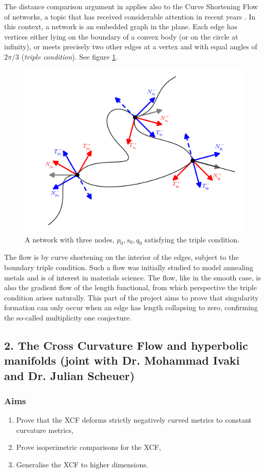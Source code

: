 \documentclass[12pt]{amsart}
\begin{document}
The distance comparison argument in \cite{MR2794630} applies also to the Curve Shortening Flow of networks, a topic that has received considerable attention in recent years \cite{MR2394409,MR2075985,MR2763716}. In this context, a network is an embedded graph in the plane. Each edge has vertices either lying on the boundary of a convex body (or on the circle at infinity), or meets precisely two other edges at a vertex and with equal angles of $2\pi/3$ (\emph{triple condition}). See figure \ref{fg:network}.
\begin{figure}[htb]
\centering
\includegraphics[width=.3\linewidth]{network}
\caption{A network with three nodes, $p_0, s_0, q_0$ satisfying the triple condition.}
\label{fg:network}
\end{figure}
The flow is by curve shortening on the interior of the edges, subject to the boundary triple condition. Such a flow was initially studied to model annealing metals \cite{MR0078836} and is of interest in materials science. The flow, like in the smooth case, is also the gradient flow of the length functional, from which perspective the triple condition arises naturally. This part of the project aims to prove that singularity formation can only occur when an edge has length collapsing to zero, confirming the so-called multiplicity one conjecture.

\subsection*{2. The Cross Curvature Flow and hyperbolic manifolds (joint with Dr. Mohammad Ivaki and Dr. Julian Scheuer)}
\label{sec-2-2}

\subsubsection*{Aims}
\label{sec-2-2-1}

\begin{enumerate}
\item Prove that the XCF deforms strictly negatively curved metrics to constant curvature metrics,
\item Prove isoperimetric comparisons for the XCF,
\item Generalise the XCF to higher dimensions.
\end{enumerate}
\end{document}
